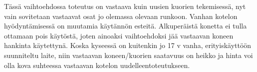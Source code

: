 Tässä vaihtoehdossa toteutus on vastaava kuin uusien kuorien tekemisessä, nyt vain sovitetaan vastaavat osat jo olemassa olevaan runkoon. Vanhan kotelon hyödyntämisessä on muutamia käytännön esteitä. Alkuperäistä konetta ei tulla ottamaan pois käytöstä, joten ainoaksi vaihtoehdoksi jää vastaavan koneen hankinta käytettynä. Koska kyseessä on kuitenkin jo 17 v vanha, erityiskäyttöön suunniteltu laite, niin vastaavan koneen/kuorien saatavuus on heikko ja hinta voi olla kova suhteessa vastaavan kotelon uudelleentoteutukseen.










